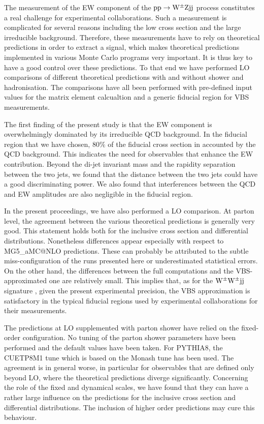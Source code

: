 \documentclass[11pt]{cernrep}
\makeatletter
\newcommand{\MGaMC}{M\protect\scalebox{0.8}{AD}G\protect\scalebox{0.8}{RAPH}5\_aMC@NLO\xspace}
\makeatother
\begin{document}
The measurement of the EW component of the ${\rm p}{\rm p} \to {\rm W}^{\pm}{\rm Z}{\rm j}{\rm j}$ process constitutes a real challenge for experimental collaborations.
Such a measurement is complicated for several reasons including the low cross section and the large irreducible background.
Therefore, these measurements have to rely on theoretical predictions in order to extract a signal,
which makes theoretical predictions implemented in various Monte Carlo programs very important.
It is thus key to have a good control over these predictions.
To that end we have performed LO comparisons of different theoretical predictions with and without shower and hadronisation.
The comparisons have all been performed with pre-defined input values for the matrix element calcualtion and a generic fiducial region for VBS measurements.

The first finding of the present study is that the EW component is overwhelmingly dominated by its irreducible QCD background.
In the fiducial region that we have chosen, $80\%$ of the fiducial cross section in accounted by the QCD background.
This indicates the need for observables that enhance the EW contribution.
Beyond the di-jet invariant mass and the rapidity separation between the two jets, we found that the distance between the two jets could have a good discriminating power.
We also found that interferences between the QCD and EW amplitudes are also negligible in the fiducial region.

In the present proceedings, we have also performed a LO comparison.
At parton level, the agreement between the various theoretical predictions is generally very good.
This statement holds both for the inclusive cross section and differential distributions.
Nonetheless differences appear especially with respect to \MGaMC predictions.
These can probably be attributed to the subtle miss-configuration of the runs presented here or underestimated statistical errors.
On the other hand, the differences between the full computations and the VBS-approximated one are relatively small.
This implies that, as for the ${\rm W}^\pm{\rm W}^\pm{\rm j}{\rm j}$ signature \cite{Anders:2018gfr}, given the present experimental precision, the VBS approximation is satisfactory in the typical fiducial regions used by experimental collaborations for their measurements.

The predictions at LO supplemented with parton shower have relied on the fixed-order configuration.
No tuning of the parton shower parameters have been performed and the default values have been taken.
For {\sc PYTHIA8}, the {\sc CUETP8M1} tune \cite{Khachatryan:2015pea} which is based on the Monash tune \cite{Skands:2014pea} has been used. 
The agreement is in general worse, in particular for observables that are defined only beyond LO, where the theoretical predictions diverge significantly.
Concerning the role of the fixed and dynamical scales, we have found that they can have a rather large influence on the predictions for the inclusive cross section and differential distributions.
The inclusion of higher order predictions may cure this behaviour.
\end{document}
